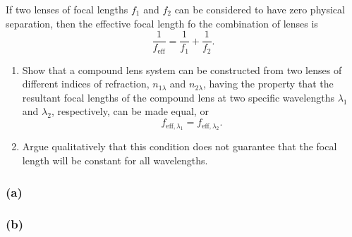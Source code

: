 \documentclass[main.tex]{subfiles}
\begin{document}
\begin{q}{4}
If two lenses of focal lengths $f_1$ and $f_2$ can be considered to have zero physical separation, then the effective focal length fo the combination of lenses is
\begin{equation}
    \frac{1}{f_{\text{eff}}} = \frac{1}{f_1} + \frac{1}{f_2}.
\end{equation}
\begin{enumerate}[label=\textbf{(\alph*)}]
    \item Show that a compound lens system can be constructed from two lenses of different indices of refraction, $n_{1\lambda}$ and $n_{2\lambda}$, having the property that the resultant focal lengths of the compound lens at two specific wavelengths $\lambda_1$ and $\lambda_2$, respectively, can be made equal, or
    \begin{equation}
        f_{\text{eff},\lambda_1} = f_{\text{eff},\lambda_2}.
    \end{equation}
    \item Argue qualitatively that this condition does not guarantee that the focal length will be constant for all wavelengths.
\end{enumerate}
\end{q}

\begin{sol}
\subsubsection*{(a)}

\subsubsection*{(b)}
\end{sol}
\end{document}
